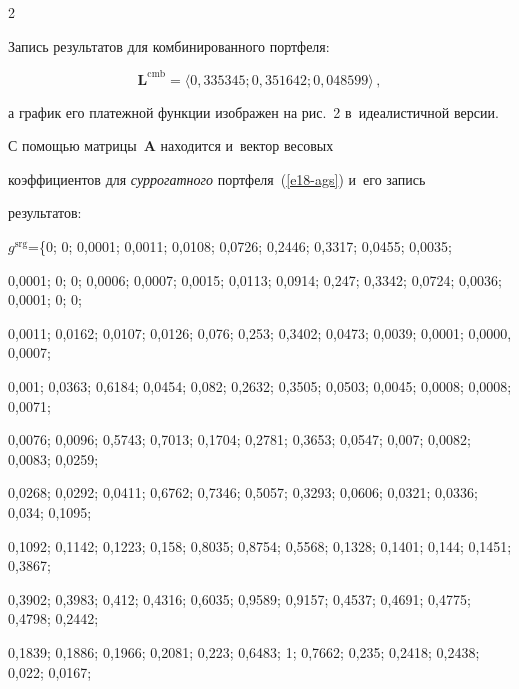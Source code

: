 \begin{multicols}{2}
 \vspace*{12pt} 


 


 


   Запись результатов для комбинированного портфеля: 


       $$


  \boldsymbol{L}^{\mathrm{cmb}}=\langle 0{,}335345; 0{,}351642; 0{,}048599\rangle\,, 


  $$


а график его платежной функции изображен на рис.~2 в~идеалистичной версии.


  





  С помощью матрицы~$\mathbf{A}$ находится и~вектор весовых 


коэффициентов для \textit{суррогатного} портфеля~(\ref{e18-ags}) и~его запись 


результатов: 





\vspace*{3pt}


  


  \noindent


  $g^{\mathrm{srg}}$\;=\;\{0; 0; 0,0001; 0,0011; 0,0108; 0,0726; 0,2446; 0,3317; 0,0455; 0,0035; 


0,0001; 0; 0; 0,0006; 0,0007; 0,0015; 0,0113; 0,0914; 0,247; 0,3342; 0,0724; 0,0036; 0,0001; 0; 0; 


0,0011; 0,0162; 0,0107; 0,0126; 0,076; 0,253; 0,3402; 0,0473; 0,0039; 0,0001; 0,0000, 0,0007; 


0,001; 0,0363; 0,6184; 0,0454; 0,082; 0,2632; 0,3505; 0,0503; 0,0045; 0,0008; 0,0008; 0,0071; 


0,0076; 0,0096; 0,5743; 0,7013; 0,1704; 0,2781; 0,3653; 0,0547; 0,007; 0,0082; 0,0083; 0,0259; 


0,0268; 0,0292; 0,0411; 0,6762; 0,7346; 0,5057; 0,3293; 0,0606; 0,0321; 0,0336; 0,034; 0,1095; 


0,1092; 0,1142; 0,1223; 0,158; 0,8035; 0,8754; 0,5568; 0,1328; 0,1401; 0,144; 0,1451; 0,3867; 


0,3902; 0,3983; 0,412; 0,4316; 0,6035; 0,9589; 0,9157; 0,4537; 0,4691; 0,4775; 0,4798; 0,2442; 


0,1839; 0,1886; 0,1966; 0,2081; 0,223; 0,6483; 1; 0,7662; 0,235; 0,2418; 0,2438; 0,022; 0,0167; 



\end{multicols}
